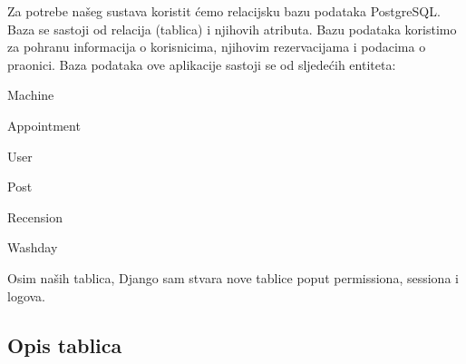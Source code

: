 				
		\noindent Za potrebe našeg sustava koristit ćemo relacijsku bazu podataka PostgreSQL.
		Baza se sastoji od relacija (tablica) i njihovih atributa. Bazu podataka koristimo za pohranu informacija o korisnicima, njihovim rezervacijama i podacima o praonici.
		Baza podataka ove aplikacije sastoji se od sljedećih entiteta:
		\begin{packed_item}
			\item 	Machine
			\item 	Appointment
			\item 	User
			\item 	Post
			\item 	Recension
			\item 	Washday
		\end{packed_item}	
	
		\noindent Osim naših tablica, Django sam stvara nove tablice poput permissiona, sessiona i logova.
		
			\subsection{Opis tablica}
			
